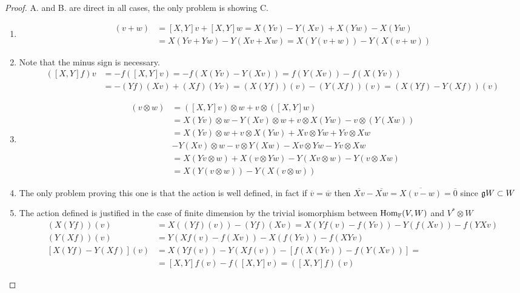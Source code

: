 \begin{proof}
	A. and B. are direct in all cases, the only problem is showing C.
	\begin{enumerate}
		\item 
		\begin{align*}
		[X,Y](v+w) &=[X,Y]v + [X,Y]w = X(Yv) - Y(Xv) + X(Yw)-X(Yw)\\ &= X(Yv+Yw) - Y(Xv+Xw) = X(Y(v+w)) - Y(X(v+w))
		\end{align*}
		\item Note that the minus sign is necessary.
		\begin{align*}
		([X,Y]f)v &= -f([X,Y]v) = -f(X(Yv)-Y(Xv)) = f(Y(Xv))-f(X(Yv)) \\&= -(Yf)(Xv) + (Xf)(Yv) = (X(Yf))(v) - (Y(Xf))(v) = (X(Yf)-Y(Xf))(v)
		\end{align*}    
		\item 
		\begin{align*}
		[X,Y](v\otimes w) &= ([X,Y]v)\otimes w + v \otimes ([X,Y]w)\\ &= X(Yv) \otimes w - Y(Xv) \otimes w + v \otimes X(Yw) - v \otimes (Y(Xw))\\
		&= X(Yv) \otimes w + v \otimes X(Yw) + Xv \otimes Yw + Yv \otimes Xw  \\
		& - Y(Xv) \otimes w - v \otimes Y(Xw) - Xv \otimes Yw - Yv \otimes Xw\\
		&= X(Yv \otimes w) + X(v \otimes Yw) - Y(Xv \otimes w) - Y(v \otimes Xw)\\ &= X(Y(v\otimes w)) - Y(X(v\otimes w))
		\end{align*}
		\item The only problem proving this one is that the action is well defined, in fact if $\overline{v} = \overline{w}$ then $\overline{Xv} - \overline{Xw} = \overline{X(v-w)} = \overline{0}$ since $\mathfrak{g} W \subset W$

		\item The action defined is justified in the case of finite dimension by the trivial isomorphism between $\text{Hom}_{\mathbb{F}}(V,W)$ and $V^*\otimes W$
		\begin{align*}
		(X(Yf))(v) &= X((Yf)(v)) - (Yf)(Xv) = X(Yf(v)-f(Yv)) - Y(f(Xv)) - f(YXv)\\
		(Y(Xf))(v) &= Y(Xf(v)-f(Xv)) - X(f(Yv)) - f(XYv)\\
		[X(Yf)-Y(Xf)](v)&= X(Yf(v)) - Y(Xf(v)) - [f(X(Yv))-f(Y(Xv))] =\\
		&= [X,Y]f(v) - f([X,Y]v) = ([X,Y]f)(v)
		\end{align*}
	\end{enumerate}
\end{proof}\\
